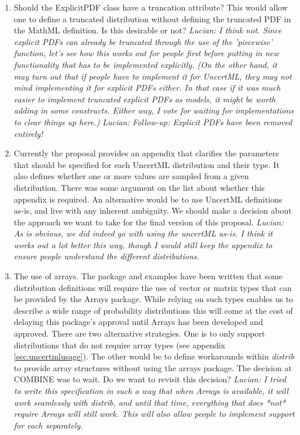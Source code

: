 \documentclass[draftspec]{sbmlpkgspec}
\newcommand{\distribshort}{\emph{distrib}\xspace}
\newcommand{\mathml}{MathML\xspace}
\newcommand{\uncertml}{UncertML\xspace}
\begin{document}
\begin{enumerate}
\item Should the ExplicitPDF class have a truncation
  attribute? This would allow one to define a truncated distribution
  without defining the truncated PDF in the \mathml definition. Is
  this desirable or not?
  \emph{Lucian:  I think not.  Since explicit PDFs can already be truncated through the use of the 'piecewise' function, let's see how this works out for people first before putting in new functionality that has to be implemented explicitly.  (On the other hand, it may turn out that if people have to implement it for UncertML, they may not mind implementing it for explicit PDFs either.  In that case if it was much easier to implement truncated explicit PDFs as models, it might be worth adding in some constructs.  Either way, I vote for waiting for implementations to clear things up here.)}
  \emph{Lucian: Follow-up:  Explicit PDFs have been removed entirely!}

\item Currently the proposal provides an appendix that clarifies the
  parameters that should be specified for each \uncertml distribution and their
  type. It also defines whether one or more values are sampled from a
  given distribution. There was some argument on the list about
  whether this appendix is required. An alternative would be to use
  \uncertml definitions as-is, and live with any inherent
  ambiguity. We should make a decision about the approach we want to
  take for the final version of this proposal.
  \emph{Lucian:  As is obvious, we did indeed go with using the uncertML as-is.  I think it works out a lot better this way, though I would still keep the appendix to ensure people understand the different distributions.}

\item The use of arrays. The package and examples have been written
  that some distribution definitions will require the use of vector or
  matrix types that can be provided by the Arrays package. While
  relying on such types enables us to describe a wide range of
  probability distributions this will come at the cost of delaying
  this package's approval until Arrays has been developed and
  approved. There are two alternative strategies. One is to only
  support distributions that do not require array types (see appendix
  \ref{sec:uncertmlusage}). The other would be to define workarounds
  within \distribshort to provide array structures without using the
  arrays package. The decision at COMBINE was to wait. Do we want to
  revisit this decision?
  \emph{Lucian:  I tried to write this specification in such a way that when Arrays is available, it will work seamlessly with distrib, and until that time, everything that does *not* require Arrays will still work.  This will also allow people to implement support for each separately.}


\end{enumerate}
\end{document}
